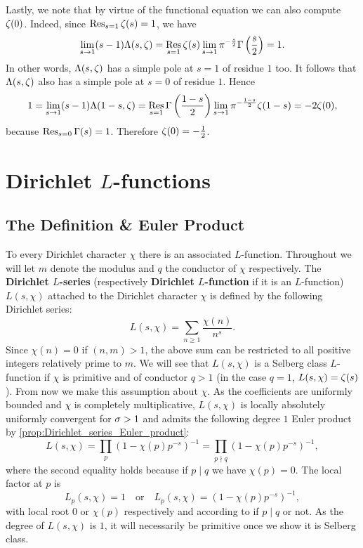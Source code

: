       Lastly, we note that by virtue of the functional equation we can also compute $\zeta(0)$. Indeed, since $\operatorname*{\mathrm{Res}}_{s = 1}\zeta(s) = 1$, we have
      \[
        \lim_{s \to 1}(s-1)\Lambda(s,\zeta) = \operatorname*{\mathrm{Res}}_{s = 1}\zeta(s)\lim_{s \to 1}\pi^{-\frac{s}{2}}\Gamma\left(\frac{s}{2}\right) = 1.
      \]
      In other words, $\Lambda(s,\zeta)$ has a simple pole at $s = 1$ of residue $1$ too. It follows that $\Lambda(s,\zeta)$ also has a simple pole at $s = 0$ of residue $1$. Hence
      \[
        1 = \lim_{s \to 1}(s-1)\Lambda(1-s,\zeta) = \operatorname*{\mathrm{Res}}_{s = 1}\Gamma\left(\frac{1-s}{2}\right)\lim_{s \to 1}\pi^{-\frac{1-s}{2}}\zeta(1-s) = -2\zeta(0),
      \]
      because $\operatorname*{\mathrm{Res}}_{s = 0}\Gamma(s) = 1$. Therefore $\zeta(0) = -\frac{1}{2}$.
  \section{Dirichlet \texorpdfstring{$L$}{L}-functions}
    \subsection*{The Definition \& Euler Product}
      To every Dirichlet character $\chi$ there is an associated $L$-function. Throughout we will let $m$ denote the modulus and $q$ the conductor of $\chi$ respectively. The \textbf{Dirichlet $L$-series} (respectively \textbf{Dirichlet $L$-function} if it is an $L$-function) $L(s,\chi)$ attached to the Dirichlet character $\chi$ is defined by the following Dirichlet series:
      \[
        L(s,\chi) = \sum_{n \ge 1}\frac{\chi(n)}{n^{s}}.
      \]
      Since $\chi(n) = 0$ if $(n,m) > 1$, the above sum can be restricted to all positive integers relatively prime to $m$. We will see that $L(s,\chi)$ is a Selberg class $L$-function if $\chi$ is primitive and of conductor $q > 1$ (in the case $q = 1$, $L(s,\chi) = \zeta(s)$). From now we make this assumption about $\chi$. As the coefficients are uniformly bounded and $\chi$ is completely multiplicative, $L(s,\chi)$ is locally absolutely uniformly convergent for $\sigma > 1$ and admits the following degree $1$ Euler product by \cref{prop:Dirichlet_series_Euler_product}:
      \[
        L(s,\chi) = \prod_{p}(1-\chi(p)p^{-s})^{-1} = \prod_{p \nmid q}(1-\chi(p)p^{-s})^{-1},
      \]
      where the second equality holds because if $p \mid q$ we have $\chi(p) = 0$. The local factor at $p$ is
      \[
        L_{p}(s,\chi) = 1 \quad \text{or} \quad L_{p}(s,\chi) = (1-\chi(p)p^{-s})^{-1},
      \]
      with local root $0$ or $\chi(p)$ respectively and according to if $p \mid q$ or not. As the degree of $L(s,\chi)$ is $1$, it will necessarily be primitive once we show it is Selberg class.
